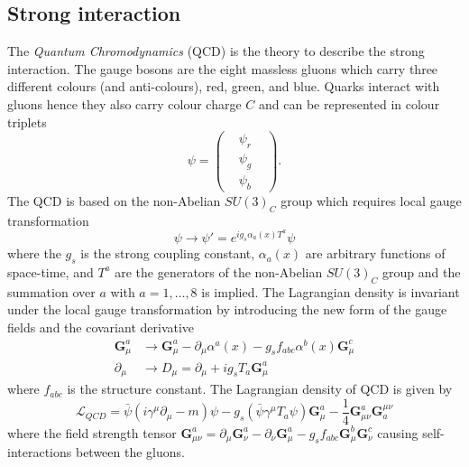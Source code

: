 \subsection{Strong interaction}
\label{subsec:sm_strong_interaction}
The \textit{Quantum Chromodynamics} (QCD) is the theory to describe the strong interaction.
The gauge bosons are the eight massless gluons which carry three different colours (and anti-colours), red, green, and blue.
Quarks interact with gluons hence they also carry colour charge $C$ and can be represented in colour triplets
%
\begin{equation}
    \psi = 
    \left(
        \begin{matrix}
            & \psi_{r} & \\
            & \psi_{g} & \\
            & \psi_{b} &
        \end{matrix}
    \right).
    \label{eq:sm_quark_triplets}
\end{equation}
%
The QCD is based on the non-Abelian $SU(3)_{C}$ group which requires local gauge transformation
%
\begin{equation}
    \psi \rightarrow \psi' = e^{i g_{s} \alpha_{a}(x) T^{a}}\psi
    \label{eq:sm_qcd_gauge_transformation_1}
\end{equation}
%
where the $g_{s}$ is the strong coupling constant, $\alpha_{a}(x)$ are arbitrary functions of space-time, and $T^{a}$ are the generators of the non-Abelian $SU(3)_{C}$ group and the summation over $a$ with $a = 1, \dots, 8$ is implied.
The Lagrangian density is invariant under the local gauge transformation by introducing the new form of the gauge fields and the covariant derivative
%
\begin{align}
    \bm{G}_{\mu}^{a} & \rightarrow \bm{G}_{\mu}^{a} -  \partial_{\mu} \alpha^{a}(x) - g_{s} f_{abc} \alpha^{b}(x) \bm{G}_{\mu}^{c} \\
    \partial_{\mu} & \rightarrow D_{\mu} = \partial_{\mu} + i g_{s} T_{a} \bm{G}_{\mu}^{a}
    \label{eq:sm_qcd_gauge_transformation_2}
\end{align}
%
where $f_{abc}$ is the structure constant. 
The Lagrangian density of QCD is given by
%
\begin{equation}
    \mathcal{L}_{QCD} = \bar{\psi}(i \gamma^{\mu} \partial_{\mu} - m) \psi - g_{s} ( \bar{\psi} \gamma^{\mu} T_{a} \psi) \bm{G}_{\mu}^{a} - \frac{1}{4} \bm{G}_{\mu\nu}^{a} \bm{G}_{a}^{\mu\nu}
    \label{eq:sm_qcd_lagrangian}
\end{equation}
%
where the field strength tensor $\bm{G}_{\mu\nu}^{a} = \partial_{\mu} \bm{G}_{\nu}^{a} - \partial_{\nu} \bm{G}_{\mu}^{a} - g_{s} f_{abc} \bm{G}_{\mu}^{b} \bm{G}_{\nu}^{c}$ causing self-interactions between the gluons.
